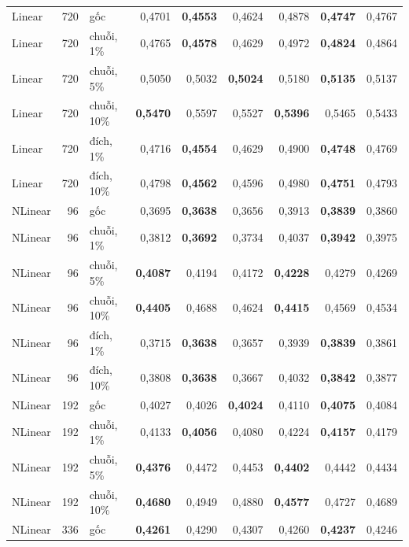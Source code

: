 {\begin{longtable}{@{}lr l rrr rrr@{}}
\addlinespace[2pt]
Linear & 720 & gốc & 0{,}4701 & \textbf{0{,}4553} & 0{,}4624 & 0{,}4878 & \textbf{0{,}4747} & 0{,}4767 \\
Linear & 720 & chuỗi, 1\% & 0{,}4765 & \textbf{0{,}4578} & 0{,}4629 & 0{,}4972 & \textbf{0{,}4824} & 0{,}4864 \\
Linear & 720 & chuỗi, 5\% & 0{,}5050 & 0{,}5032 & \textbf{0{,}5024} & 0{,}5180 & \textbf{0{,}5135} & 0{,}5137 \\
Linear & 720 & chuỗi, 10\% & \textbf{0{,}5470} & 0{,}5597 & 0{,}5527 & \textbf{0{,}5396} & 0{,}5465 & 0{,}5433 \\
Linear & 720 & đích, 1\% & 0{,}4716 & \textbf{0{,}4554} & 0{,}4629 & 0{,}4900 & \textbf{0{,}4748} & 0{,}4769 \\
Linear & 720 & đích, 10\% & 0{,}4798 & \textbf{0{,}4562} & 0{,}4596 & 0{,}4980 & \textbf{0{,}4751} & 0{,}4793 \\
\addlinespace[2pt]
NLinear & 96 & gốc & 0{,}3695 & \textbf{0{,}3638} & 0{,}3656 & 0{,}3913 & \textbf{0{,}3839} & 0{,}3860 \\
NLinear & 96 & chuỗi, 1\% & 0{,}3812 & \textbf{0{,}3692} & 0{,}3734 & 0{,}4037 & \textbf{0{,}3942} & 0{,}3975 \\
NLinear & 96 & chuỗi, 5\% & \textbf{0{,}4087} & 0{,}4194 & 0{,}4172 & \textbf{0{,}4228} & 0{,}4279 & 0{,}4269 \\
NLinear & 96 & chuỗi, 10\% & \textbf{0{,}4405} & 0{,}4688 & 0{,}4624 & \textbf{0{,}4415} & 0{,}4569 & 0{,}4534 \\
NLinear & 96 & đích, 1\% & 0{,}3715 & \textbf{0{,}3638} & 0{,}3657 & 0{,}3939 & \textbf{0{,}3839} & 0{,}3861 \\
NLinear & 96 & đích, 10\% & 0{,}3808 & \textbf{0{,}3638} & 0{,}3667 & 0{,}4032 & \textbf{0{,}3842} & 0{,}3877 \\
\addlinespace[2pt]
NLinear & 192 & gốc & 0{,}4027 & 0{,}4026 & \textbf{0{,}4024} & 0{,}4110 & \textbf{0{,}4075} & 0{,}4084 \\
NLinear & 192 & chuỗi, 1\% & 0{,}4133 & \textbf{0{,}4056} & 0{,}4080 & 0{,}4224 & \textbf{0{,}4157} & 0{,}4179 \\
NLinear & 192 & chuỗi, 5\% & \textbf{0{,}4376} & 0{,}4472 & 0{,}4453 & \textbf{0{,}4402} & 0{,}4442 & 0{,}4434 \\
NLinear & 192 & chuỗi, 10\% & \textbf{0{,}4680} & 0{,}4949 & 0{,}4880 & \textbf{0{,}4577} & 0{,}4727 & 0{,}4689 \\
\addlinespace[2pt]
NLinear & 336 & gốc & \textbf{0{,}4261} & 0{,}4290 & 0{,}4307 & 0{,}4260 & \textbf{0{,}4237} & 0{,}4246 \\

\end{longtable}}

